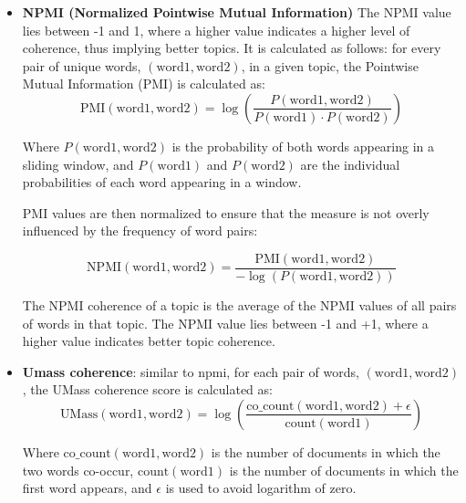 \begin{itemize}
    \item \textbf{NPMI (Normalized Pointwise Mutual Information)} The NPMI value lies between -1 and 1, where a higher value indicates a higher level of coherence, thus implying better topics. It is calculated as follows: 
    for every pair of unique words, $(\text{{word1}}, \text{{word2}})$, in a given topic, the Pointwise Mutual Information (PMI) is calculated as:
    \begin{equation} 
    \text{{PMI}}(\text{{word1}}, \text{{word2}}) = \log\left(\frac{P(\text{{word1}}, \text{{word2}})}{P(\text{{word1}}) \cdot P(\text{{word2}})} \right)
    \end{equation}
    
    Where $P(\text{{word1}}, \text{{word2}})$ is the probability of both words appearing in a sliding window, and $P(\text{{word1}})$ and $P(\text{{word2}})$ are the individual probabilities of each word appearing in a window.
    
    PMI values are then normalized to ensure that the measure is not overly influenced by the frequency of word pairs:
    
    \begin{equation} 
    \text{{NPMI}}(\text{{word1}}, \text{{word2}}) = \frac{\text{{PMI}} (\text{{word1}}, \text{{word2}})}{-\log(P(\text{{word1}}, \text{{word2}}))}
    \end{equation}
    
    The NPMI coherence of a topic is the average of the NPMI values of all pairs of words in that topic. The NPMI value lies between -1 and +1, where a higher value indicates better topic coherence.
    
    
    \item \textbf{Umass coherence}: similar to npmi, 
    for each pair of words, $(\text{{word1}}, \text{{word2}})$, the UMass coherence score is calculated as:
    \begin{equation} 
    \text{{UMass}}(\text{{word1}}, \text{{word2}}) = \log\left(\frac{\text{{co\_count}}(\text{{word1}}, \text{{word2}}) + \epsilon}{\text{{count}}(\text{{word1}})} \right)
    \end{equation}
    
    Where $\text{{co\_count}}(\text{{word1}}, \text{{word2}})$ is the number of documents in which the two words co-occur, $\text{{count}}(\text{{word1}})$ is the number of documents in which the first word appears, and $\epsilon$ is used to avoid logarithm of zero.
    

\end{itemize}
